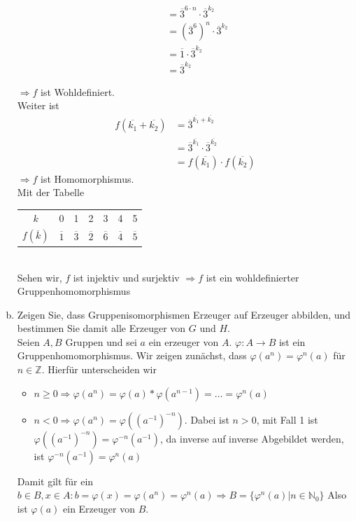\documentclass{article}
\newcommand{\N}{\mathbb{N}}
\newcommand{\Z}{\mathbb{Z}}
\begin{document}
\begin{enumerate}[(a)]
\begin{itemize}
\begin{align*}
                    &=\overline{3}^{6\cdot n}\cdot\overline{3}^{k_2}\\
                    &=\left(\overline{3}^6\right)^n\cdot\overline{3}^{k_2}\\
                    &=\overline{1}\cdot\overline{3}^{k_2}\\
                    &=\overline{3}^{k_2}
                \end{align*}
        \end{itemize}
        $\Rightarrow f$ ist Wohldefiniert.\\
        Weiter ist
        \begin{align*}
            f(\overline{k_1}+\overline{k_2})&=\overline{3}^{\overline{k_1}+\overline{k_2}}\\
            &=\overline{3}^{\overline{k_1}}\cdot\overline{3}^{\overline{k_2}}\\
            &=f(\overline{k_1})\cdot f(\overline{k_2})
        \end{align*}
        $\Rightarrow f$ ist Homomorphismus.\\
        Mit der Tabelle\\
        \begin{tabular}{c|llllll}
            $k$&0&1&2&3&4&5\\
            $f(\overline{k})$&
            $\overline{1}$&
            $\overline{3}$&
            $\overline{2}$&
            $\overline{6}$&
            $\overline{4}$&
            $\overline{5}$
        \end{tabular}\\
        Sehen wir, $f$ ist injektiv und surjektiv $\Rightarrow f$ ist ein wohldefinierter Gruppenhomomorphismus
    \item
        \color{blue}
        Zeigen Sie, dass Gruppenisomorphismen Erzeuger auf Erzeuger
        abbilden, und bestimmen Sie damit alle Erzeuger von $G$ und $H$.\\
        \color{black}
        Seien $A,B$ Gruppen und sei $a$ ein erzeuger von $A$. $\varphi:A\to B$ ist ein Gruppenhomomorphismus.
        Wir zeigen zunächst, dass $\varphi(a^n)=\varphi^n(a)$ für $n\in\Z$. Hierfür unterscheiden wir
        \begin{itemize}
            \item $n\geq 0\Rightarrow \varphi(a^n)=\varphi(a)*\varphi(a^{n-1})=\hdots=\varphi^n(a)$
            \item $n< 0\Rightarrow \varphi(a^n)=\varphi((a^{-1})^{-n})$. Dabei ist $n>0$, mit Fall 1 ist
                $\varphi((a^{-1})^{-n})=\varphi^{-n}(a^{-1})$, da inverse auf inverse Abgebildet werden, ist
                $\varphi^{-n}(a^{-1})=\varphi^{n}(a)$
        \end{itemize}
        Damit gilt für ein $b\in B,x\in A:b=\varphi(x)=\varphi(a^n)=\varphi^n(a)\Rightarrow B=\{\varphi^n(a)|n\in\N_0\}$
        Also ist $\varphi(a)$ ein Erzeuger von $B$.


\end{enumerate}
\end{document}

